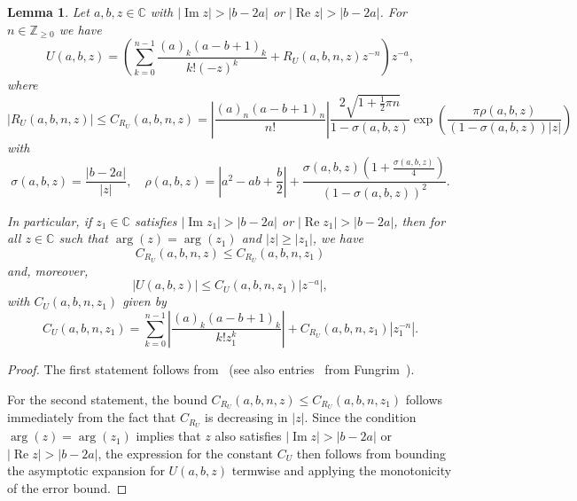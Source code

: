 \documentclass[11pt]{article}
\DeclareMathOperator{\real}{Re}
\DeclareMathOperator{\imag}{Im}
\newtheorem{lemma}[definition]{Lemma}
\begin{document}
\begin{lemma}
  \label{lemma:U}
  Let \(a, b, z \in \mathbb{C}\) with \(|\imag z| > |b - 2a|\) or
  \(|\real z| > |b - 2a|\). For \(n \in \mathbb{Z}_{\geq 0}\) we have
  \begin{equation*}
    U(a, b, z) = \left(\sum_{k = 0}^{n - 1} \frac{(a)_{k}(a - b + 1)_{k}}{k!(-z)^{k}} + R_{U}(a, b, n, z)z^{-n}\right)z^{-a},
  \end{equation*}
  where
  \begin{equation*}
    \left|R_{U}\!\left(a,b,n,z\right)\right| \leq
    C_{R_{U}}(a, b, n, z) =
    \left|\frac{\left(a\right)_{n} \left(a - b + 1\right)_{n}}{n!}\right|
    \frac{2 \sqrt{1 + \frac{1}{2} \pi n}}{1 - \sigma(a, b, z)}
    \exp\!\left(\frac{\pi \rho(a, b, z)}{\left(1 - \sigma(a, b, z)\right) \left|z\right|}\right)
  \end{equation*}
  with
  \begin{equation*}
    \sigma(a, b, z) = \frac{\left|b - 2 a\right|}{\left|z\right|},\quad
    \rho(a, b, z) = \left|{a}^{2} - a b + \frac{b}{2}\right| + \frac{\sigma(a, b, z) \left(1 + \frac{\sigma(a, b, z)}{4}\right)}{{\left(1 - \sigma(a, b, z)\right)}^{2}}.
  \end{equation*}

  In particular, if \(z_1 \in \mathbb{C}\) satisfies
  \(|\imag z_1| > |b - 2a|\) or \(|\real z_1| > |b - 2a|\), then for
  all \(z \in \mathbb{C}\) such that \(\arg(z) = \arg(z_{1})\) and
  \(|z| \geq |z_{1}|\), we have
  \begin{equation*}
    C_{R_{U}}(a, b, n, z) \leq C_{R_{U}}(a, b, n, z_{1})
  \end{equation*}
  and, moreover,
  \begin{equation*}
    |U(a, b, z)| \leq C_{U}(a,b,n,z_{1})|z^{-a}|,
  \end{equation*}
  with \(C_{U}(a,b,n,z_{1})\) given by
  \begin{equation*}
    C_{U}(a,b,n,z_{1}) = \sum_{k = 0}^{n - 1} \left|\frac{(a)_{k}(a - b + 1)_{k}}{k!z_1^{k}}\right| +
    C_{R_{U}}(a, b, n, z_{1})|z_{1}^{-n}|.
  \end{equation*}
\end{lemma}

\begin{proof}
  The first statement follows from~\cite[Sec.~13.7]{NIST:DLMF} (see
  also entries~\cite{fungrim-c8fcc7,fungrim-d1b3b5,fungrim-461a54}
  from Fungrim~\cite{Johansson2020fungrim}).

  For the second statement, the bound
  \(C_{R_{U}}(a, b, n, z) \leq C_{R_{U}}(a, b, n, z_{1})\) follows
  immediately from the fact that \(C_{R_{U}}\) is decreasing in
  \(|z|\). Since the condition \(\arg(z) = \arg(z_{1})\) implies that
  \(z\) also satisfies \(|\imag z| > |b - 2a|\) or
  \(|\real z| > |b - 2a|\), the expression for the constant \(C_{U}\)
  then follows from bounding the asymptotic expansion for
  \(U(a, b, z)\) termwise and applying the monotonicity of the error
  bound.
\end{proof}
\end{document}
